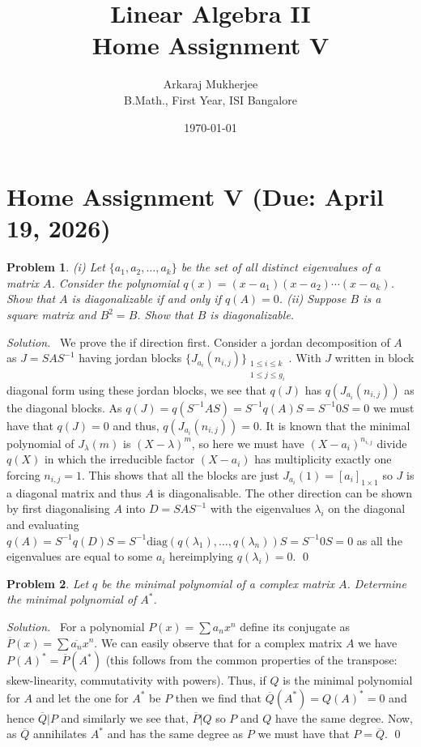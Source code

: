 \documentclass[12pt,a4paper]{article}
\title{\textbf{Linear Algebra II} \\ \large Home Assignment V}
\author{Arkaraj Mukherjee \\ B.Math., First Year, ISI Bangalore}
\date{\today}
\newenvironment{solution}{%
  \par\noindent\textit{Solution.}\ }{\qed}
\theoremstyle{problemstyle}
\newtheorem{problem}{Problem}[section]
\begin{document}
\maketitle
\newpage
\tableofcontents
\newpage
\section{Home Assignment V (Due: April 19, 2026)}
\begin{problem}\label{prob:5-1}
  (i) Let $\{a_1, a_2, \ldots, a_k\}$ be the set of all distinct eigenvalues of a matrix $A$. Consider the polynomial $q(x) = (x - a_1)(x - a_2)\cdots(x - a_k)$. Show that $A$ is diagonalizable if and only if $q(A) = 0$.
  (ii) Suppose $B$ is a square matrix and $B^2 = B$. Show that $B$ is diagonalizable.
\end{problem}
\begin{solution}
We prove the if direction first.
Consider a jordan decomposition of $A$ as $J=SAS^{-1}$ having jordan blocks $\{J_{a_i}(n_{i,j})\}_{\substack{1\leq i\leq k\\ 1\leq j\leq g_i}}$.
With $J$ written in block diagonal form using these jordan blocks, we see that $q(J)$ has $q(J_{a_i}(n_{i,j}))$ as the diagonal blocks.
As $q(J)=q(S^{-1}AS)=S^{-1}q(A)S=S^{-1}0S=0$ we must have that $q(J)=0$ and thus, $q(J_{a_i}(n_{i,j}))=0$. 
It is known that the minimal polynomial of $J_\lambda(m)$ is $(X-\lambda)^{m}$, so here we must have $(X-a_i)^{n_{i,j}}$ divide $q(X)$ in which the irreducible factor $(X-a_i)$ has multiplicity exactly one forcing $n_{i,j}=1$. 
This shows that all the blocks are just $J_{a_i}(1)=[a_i]_{1\times 1}$ so $J$ is a diagonal matrix and thus $A$ is diagonalisable.
The other direction can be shown by first diagonalising $A$ into $D=SAS^{-1}$ with the eigenvalues $\lambda_i$ on the diagonal and evaluating $q(A)=S^{-1}q(D)S=S^{-1}\text{diag}(q(\lambda_1),\ldots,q(\lambda_n))S=S^{-1}0S=0$ as all the eigenvalues are equal to some $a_i$ hereimplying $q(\lambda_i)=0$.
\end{solution}
\begin{problem}\label{prob:5-2}
Let $q$ be the minimal polynomial of a complex matrix $A$. Determine the minimal polynomial of $A^*$.
\end{problem}
\begin{solution}
	For a polynomial $P(x)=\sum a_nx^n$ define its conjugate as $\overline{P}(x)=\sum\overline{a_n}x^n$. 
	We can easily observe that for a complex matrix $A$ we have $P(A)^*=\overline{P}(A^*)$ (this follows from the common properties of the transpose: skew-linearity, commutativity with powers). 
	Thus, if $Q$ is the minimal polynomial for $A$ and let the one for $A^*$ be $P$ then we find that $\overline{Q}(A^*)=Q(A)^*=0$ and hence $\overline{Q}|P$ and similarly we see that, $\overline{P}|Q$ so $P$ and $Q$ have the same degree. 
	Now, as $\overline{Q}$ annihilates $A^*$ and has the same degree as $P$ we must have that $P=\overline{Q}$.
\end{solution}
\end{document}
